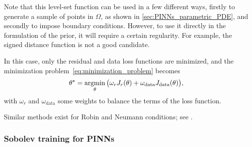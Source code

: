 
\begin{remark}
	Note that this level-set function can be used in a few different ways, firstly to generate a sample of points in $\Omega$, as shown in \cref{sec:PINNs_parametric_PDE}, and secondly to impose boundary conditions. However, to use it directly in the formulation of the prior, it will require a certain regularity. For example, the signed distance function is not a good candidate.
\end{remark}

In this case, only the residual and data loss functions are minimized,
and the minimization problem~\eqref{eq:minimization_problem} becomes
\begin{equation*}
	\label{eq:minimization_problem_without_lossBC}
	\theta^\star = \operatorname*{argmin}_{\theta}
	\big( \omega_r J_r(\theta) + \omega_\text{data} J_\text{data}(\theta) \big),
\end{equation*}
with $\omega_r$ and $\omega_\text{data}$ some weights to balance the terms of the loss function.

\begin{remark}
	Similar methods exist for Robin and Neumann conditions; see \cite{Sukumar_2022}.
\end{remark}


\subsubsection{Sobolev training for PINNs}\label{sec:sobolev_training}

